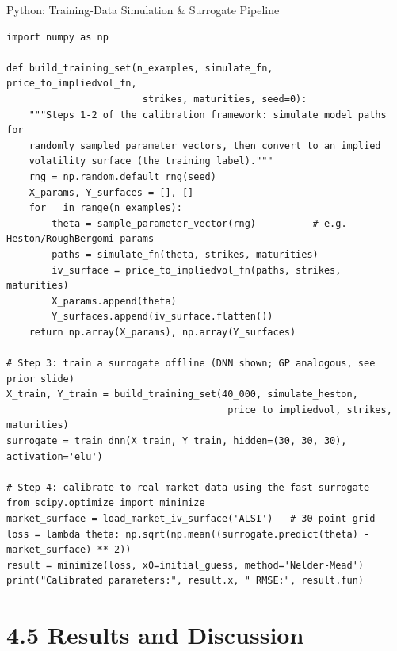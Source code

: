 \documentclass[aspectratio=169,10pt]{beamer}
\begin{document}
\begin{frame}[fragile]{Python: Training-Data Simulation \& Surrogate Pipeline}
\begin{lstlisting}[style=python]
import numpy as np

def build_training_set(n_examples, simulate_fn, price_to_impliedvol_fn,
                        strikes, maturities, seed=0):
    """Steps 1-2 of the calibration framework: simulate model paths for
    randomly sampled parameter vectors, then convert to an implied
    volatility surface (the training label)."""
    rng = np.random.default_rng(seed)
    X_params, Y_surfaces = [], []
    for _ in range(n_examples):
        theta = sample_parameter_vector(rng)          # e.g. Heston/RoughBergomi params
        paths = simulate_fn(theta, strikes, maturities)
        iv_surface = price_to_impliedvol_fn(paths, strikes, maturities)
        X_params.append(theta)
        Y_surfaces.append(iv_surface.flatten())
    return np.array(X_params), np.array(Y_surfaces)

# Step 3: train a surrogate offline (DNN shown; GP analogous, see prior slide)
X_train, Y_train = build_training_set(40_000, simulate_heston,
                                       price_to_impliedvol, strikes, maturities)
surrogate = train_dnn(X_train, Y_train, hidden=(30, 30, 30), activation='elu')

# Step 4: calibrate to real market data using the fast surrogate
from scipy.optimize import minimize
market_surface = load_market_iv_surface('ALSI')   # 30-point grid
loss = lambda theta: np.sqrt(np.mean((surrogate.predict(theta) - market_surface) ** 2))
result = minimize(loss, x0=initial_guess, method='Nelder-Mead')
print("Calibrated parameters:", result.x, " RMSE:", result.fun)
\end{lstlisting}
\end{frame}

\section{4.5 Results and Discussion}
\end{document}
